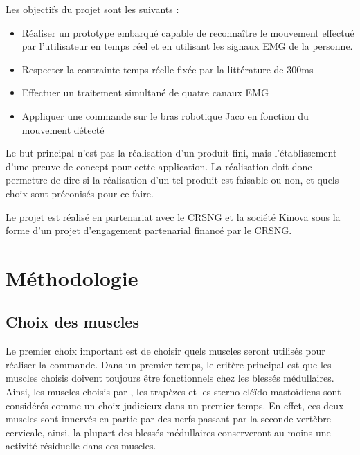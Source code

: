 \documentclass[letterpaper, twoside, 12pt, memoire, creativecommons, hyperref]{thETS}
\begin{document}
Les objectifs du projet sont les suivants : 

\begin{itemize}
 \item Réaliser un prototype embarqué capable de reconnaître le mouvement effectué par l'utilisateur en temps réel et en utilisant les signaux EMG de la personne.
 \item Respecter la contrainte temps-réelle fixée par la littérature de 300ms
 \item Effectuer un traitement simultané de quatre canaux EMG
 \item Appliquer une commande sur le bras robotique Jaco en fonction du mouvement détecté
\end{itemize}

Le but principal n'est pas la réalisation d'un produit fini, mais l'établissement d'une preuve de concept pour cette application. La réalisation doit donc permettre de dire si la réalisation d'un tel produit est faisable ou non, et quels choix sont préconisés pour ce faire.

Le projet est réalisé en partenariat avec le CRSNG et la société Kinova sous la forme d'un projet d'engagement partenarial financé par le CRSNG. 

\chapter{Méthodologie}
\label{CHmethodo}

\section{Choix des muscles}

Le premier choix important est de choisir quels muscles seront utilisés pour réaliser la commande. Dans un premier temps, le critère principal est que les muscles choisis doivent toujours être fonctionnels chez les blessés médullaires. Ainsi, les muscles choisis par \cite{Chang1996}, les trapèzes et les sterno-cléïdo mastoïdiens sont considérés comme un choix judicieux dans un premier temps. En effet, ces deux muscles sont innervés en partie par des nerfs passant par la seconde vertèbre cervicale, ainsi, la plupart des blessés médullaires conserveront au moins une activité résiduelle dans ces muscles. 
\end{document}
